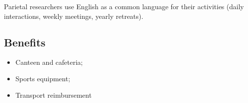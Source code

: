 \documentclass{article}
\begin{document}
Parietal researchers use English as a common language for their
activities (daily interactions, weekly meetings, yearly retreats).


\subsection*{Benefits}

\begin{itemize}
\item Canteen and cafeteria;
\item Sports equipment;
\item Transport reimbursement 
\end{itemize}

% 
%
\end{document}
